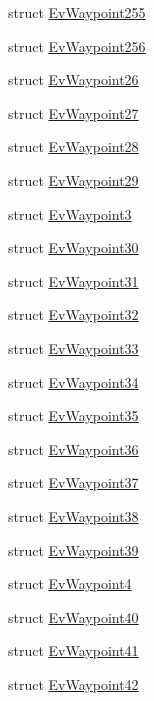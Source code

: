 \begin{DoxyCompactItemize}
\item 
struct \hyperlink{structmove__base__z__client_1_1EvWaypoint255}{Ev\+Waypoint255}
\item 
struct \hyperlink{structmove__base__z__client_1_1EvWaypoint256}{Ev\+Waypoint256}
\item 
struct \hyperlink{structmove__base__z__client_1_1EvWaypoint26}{Ev\+Waypoint26}
\item 
struct \hyperlink{structmove__base__z__client_1_1EvWaypoint27}{Ev\+Waypoint27}
\item 
struct \hyperlink{structmove__base__z__client_1_1EvWaypoint28}{Ev\+Waypoint28}
\item 
struct \hyperlink{structmove__base__z__client_1_1EvWaypoint29}{Ev\+Waypoint29}
\item 
struct \hyperlink{structmove__base__z__client_1_1EvWaypoint3}{Ev\+Waypoint3}
\item 
struct \hyperlink{structmove__base__z__client_1_1EvWaypoint30}{Ev\+Waypoint30}
\item 
struct \hyperlink{structmove__base__z__client_1_1EvWaypoint31}{Ev\+Waypoint31}
\item 
struct \hyperlink{structmove__base__z__client_1_1EvWaypoint32}{Ev\+Waypoint32}
\item 
struct \hyperlink{structmove__base__z__client_1_1EvWaypoint33}{Ev\+Waypoint33}
\item 
struct \hyperlink{structmove__base__z__client_1_1EvWaypoint34}{Ev\+Waypoint34}
\item 
struct \hyperlink{structmove__base__z__client_1_1EvWaypoint35}{Ev\+Waypoint35}
\item 
struct \hyperlink{structmove__base__z__client_1_1EvWaypoint36}{Ev\+Waypoint36}
\item 
struct \hyperlink{structmove__base__z__client_1_1EvWaypoint37}{Ev\+Waypoint37}
\item 
struct \hyperlink{structmove__base__z__client_1_1EvWaypoint38}{Ev\+Waypoint38}
\item 
struct \hyperlink{structmove__base__z__client_1_1EvWaypoint39}{Ev\+Waypoint39}
\item 
struct \hyperlink{structmove__base__z__client_1_1EvWaypoint4}{Ev\+Waypoint4}
\item 
struct \hyperlink{structmove__base__z__client_1_1EvWaypoint40}{Ev\+Waypoint40}
\item 
struct \hyperlink{structmove__base__z__client_1_1EvWaypoint41}{Ev\+Waypoint41}
\item 
struct \hyperlink{structmove__base__z__client_1_1EvWaypoint42}{Ev\+Waypoint42}

\end{DoxyCompactItemize}
